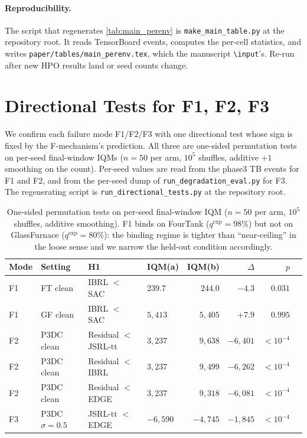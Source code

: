 \documentclass{article}
\begin{document}
\paragraph{Reproducibility.} The script that regenerates \cref{tab:main_perenv}
is \texttt{make\_main\_table.py} at the repository root. It reads
TensorBoard events, computes the per-cell statistics, and writes
\texttt{paper/tables/main\_perenv.tex}, which the manuscript
\texttt{\textbackslash input}'s. Re-run after new HPO results land
or seed counts change.

\section{Directional Tests for F1, F2, F3}
\label{app:directional_tests}

We confirm each failure mode F1/F2/F3 with one directional test
whose sign is fixed by the F-mechanism's prediction. All three are
one-sided permutation tests on per-seed final-window IQMs ($n{=}50$
per arm, $10^{5}$ shuffles, additive $+1$ smoothing on the count).
Per-seed values are read from the phase3 TB events for F1 and F2,
and from the per-seed dump of \texttt{run\_degradation\_eval.py}
for F3. The regenerating script is
\texttt{run\_directional\_tests.py} at the repository root.

\begin{table}[h]
\centering
\footnotesize
\setlength{\tabcolsep}{4pt}
\renewcommand{\arraystretch}{1.15}
\begin{tabular}{@{}llllrrrl@{}}
\toprule
\textbf{Mode} & \textbf{Setting} & \textbf{H1} & \textbf{IQM(a)} & \textbf{IQM(b)} & \textbf{$\Delta$} & \textbf{$p$} \\
\midrule
F1 & FT clean        & IBRL $<$ SAC        & $239.7$   & $244.0$   & $-4.3$     & $0.031$    \\
F1 & GF clean        & IBRL $<$ SAC        & $5{,}413$ & $5{,}405$ & $+7.9$     & $0.995$    \\
F2 & P3DC clean      & Residual $<$ JSRL-tt & $3{,}237$ & $9{,}638$ & $-6{,}401$ & $<10^{-4}$ \\
F2 & P3DC clean      & Residual $<$ IBRL    & $3{,}237$ & $9{,}499$ & $-6{,}262$ & $<10^{-4}$ \\
F2 & P3DC clean      & Residual $<$ EDGE    & $3{,}237$ & $9{,}318$ & $-6{,}081$ & $<10^{-4}$ \\
\midrule
F3 & P3DC $\sigma{=}0.5$ & JSRL-tt $<$ EDGE & $-6{,}590$ & $-4{,}745$ & $-1{,}845$ & $<10^{-4}$ \\
\bottomrule
\end{tabular}
\caption{One-sided permutation tests on per-seed final-window IQM
($n{=}50$ per arm, $10^{5}$ shuffles, additive smoothing). F1
binds on FourTank ($q^{\mathrm{exp}}\!=\!98\%$) but not on
GlassFurnace ($q^{\mathrm{exp}}\!=\!80\%$): the binding regime is
tighter than ``near-ceiling'' in the loose sense and we narrow the
held-out condition accordingly.}
\label{tab:directional_tests}
\end{table}
\end{document}

